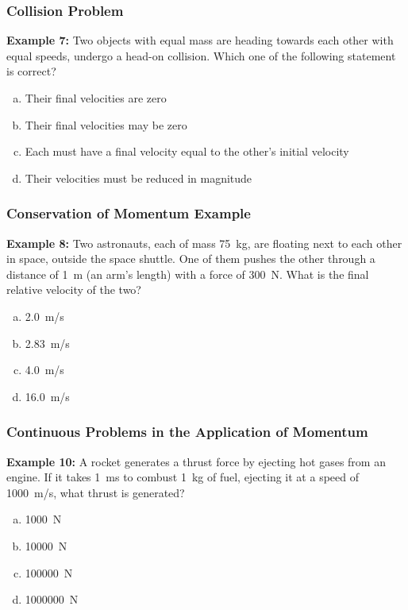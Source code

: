 \documentclass[12pt,compress,aspectratio=169]{beamer}
\begin{document}
\begin{frame}
  \frametitle{Collision Problem}
  \textbf{Example 7:} Two objects with equal mass are heading towards each
  other with equal speeds, undergo a head-on collision. Which one of the
  following statement is correct?
  \begin{enumerate}[(a)]
  \item Their final velocities are zero
  \item Their final velocities may be zero
  \item Each must have a final velocity equal to the other's initial velocity
  \item Their velocities must be reduced in magnitude
  \end{enumerate}
\end{frame}

\begin{frame}
  \frametitle{Conservation of Momentum Example}
  \textbf{Example 8:} Two astronauts, each of mass \SI{75}{kg}, are floating
  next to each other in space, outside the space shuttle. One of them pushes
  the other through a distance of \SI{1}{m} (an arm's length) with a force of
  \SI{300}{\newton}. What is the final relative velocity of the two?
  \begin{enumerate}[(a)]
  \item \SI{2.0}{m/s}
  \item \SI{2.83}{m/s}
  \item \SI{4.0}{m/s}
  \item \SI{16.0}{m/s}
  \end{enumerate}
\end{frame}

\begin{frame}
  \frametitle{Continuous Problems in the Application of Momentum}

%
  \textbf{Example 10:} A rocket generates a thrust force by ejecting hot gases
  from an engine. If it takes \SI{1}{\milli\second} to combust \SI{1}{kg} of
  fuel, ejecting it at a speed of \SI{1000}{m/s}, what thrust is generated?
  \begin{enumerate}[(a)]
  \item \SI{1000}{\newton}
  \item \SI{10000}{\newton}
  \item \SI{100000}{\newton}
  \item \SI{1000000}{\newton}
  \end{enumerate}
\end{frame}
\end{document}
